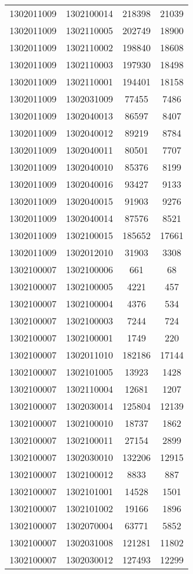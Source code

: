 \begin{longtable}{llcc}
1302011009 & 1302100014 & 218398 & 21039\\
1302011009 & 1302110005 & 202749 & 18900\\
1302011009 & 1302110002 & 198840 & 18608\\
1302011009 & 1302110003 & 197930 & 18498\\
1302011009 & 1302110001 & 194401 & 18158\\
1302011009 & 1302031009 & 77455 & 7486\\
1302011009 & 1302040013 & 86597 & 8407\\
1302011009 & 1302040012 & 89219 & 8784\\
1302011009 & 1302040011 & 80501 & 7707\\
1302011009 & 1302040010 & 85376 & 8199\\
1302011009 & 1302040016 & 93427 & 9133\\
1302011009 & 1302040015 & 91903 & 9276\\
1302011009 & 1302040014 & 87576 & 8521\\
1302011009 & 1302100015 & 185652 & 17661\\
1302011009 & 1302012010 & 31903 & 3308\\
1302100007 & 1302100006 & 661 & 68\\
1302100007 & 1302100005 & 4221 & 457\\
1302100007 & 1302100004 & 4376 & 534\\
1302100007 & 1302100003 & 7244 & 724\\
1302100007 & 1302100001 & 1749 & 220\\
1302100007 & 1302011010 & 182186 & 17144\\
1302100007 & 1302101005 & 13923 & 1428\\
1302100007 & 1302110004 & 12681 & 1207\\
1302100007 & 1302030014 & 125804 & 12139\\
1302100007 & 1302100010 & 18737 & 1862\\
1302100007 & 1302100011 & 27154 & 2899\\
1302100007 & 1302030010 & 132206 & 12915\\
1302100007 & 1302100012 & 8833 & 887\\
1302100007 & 1302101001 & 14528 & 1501\\
1302100007 & 1302101002 & 19166 & 1896\\
1302100007 & 1302070004 & 63771 & 5852\\
1302100007 & 1302031008 & 121281 & 11802\\
1302100007 & 1302030012 & 127493 & 12299\\

\end{longtable}
